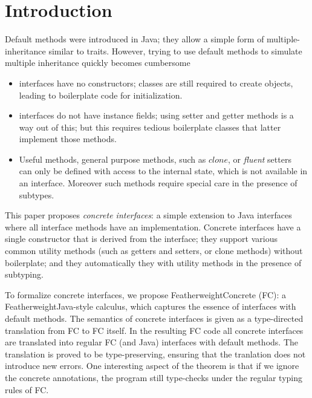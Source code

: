 \section{Introduction}\label{sec:intro}


Default methods were introduced in Java; they allow a simple form 
of multiple-inheritance similar to traits. However, trying to 
use default methods to simulate multiple inheritance quickly becomes 
cumbersome

\begin{itemize}

\item interfaces have no constructors; classes are still required to
create objects, leading to boilerplate code for initialization.

\item interfaces do not have instance fields; using setter and getter 
methods is a way out of this; but this requires tedious boilerplate 
classes that latter implement those methods.

\item Useful methods, general purpose methods, such as $clone$, or 
\emph{fluent} setters~\cite{} can only be defined 
with access to the internal state, which is not available in 
an interface. Moreover such methods require special care in the 
presence of subtypes. 

\end{itemize}

This paper proposes \emph{concrete interfaces}: a simple extension 
to Java interfaces where all interface methods have an implementation. 
Concrete interfaces have a single constructor that is derived from the 
interface; they support various common utility methods (such as getters 
and setters, or clone methods) without boilerplate; and they automatically 
they with utility methods in the presence of subtyping. 

To formalize concrete interfaces, we propose FeatherweightConcrete (FC): 
a FeatherweightJava-style calculus, which captures the essence 
of interfaces with default methods. The semantics of concrete interfaces 
is given as a type-directed translation from FC to FC itself. 
In the resulting FC code all concrete interfaces are translated into 
regular FC (and Java) interfaces with default methods. The translation 
is proved to be type-preserving, ensuring that the tranlation does 
not introduce new errors. One interesting aspect of the theorem is that 
if we ignore the concrete annotations, the program still type-checks 
under the regular typing rules of FC.

